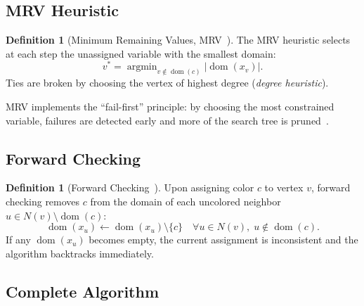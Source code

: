 \documentclass[12pt,letterpaper]{article}
\theoremstyle{plain}
\theoremstyle{definition}
\newtheorem{definition}[theorem]{Definition}
\theoremstyle{remark}
\newcommand{\dom}{\operatorname{dom}}
\newcommand{\argmin}{\operatorname{argmin}}
\begin{document}
\subsection{MRV Heuristic}

\begin{definition}[Minimum Remaining Values, MRV~\cite{russell2020}]
The MRV heuristic selects at each step the unassigned variable with the smallest
domain:
\begin{equation}
    v^* = \argmin_{v \notin \dom(c)} |\dom(x_v)|.
\end{equation}
Ties are broken by choosing the vertex of highest degree (\textit{degree
heuristic}).
\end{definition}

MRV implements the ``fail-first'' principle: by choosing the most constrained
variable, failures are detected early and more of the search tree is
pruned~\cite{haralick1980}.

\subsection{Forward Checking}

\begin{definition}[Forward Checking~\cite{haralick1980}]
Upon assigning color $c$ to vertex $v$, forward checking removes $c$ from the
domain of each uncolored neighbor $u \in N(v) \setminus \dom(c)$:
\begin{equation}
    \dom(x_u) \gets \dom(x_u) \setminus \{c\} \quad \forall u \in N(v),\; u \notin \dom(c).
\end{equation}
If any $\dom(x_u)$ becomes empty, the current assignment is inconsistent and the
algorithm backtracks immediately.
\end{definition}

\subsection{Complete Algorithm}
\end{document}
